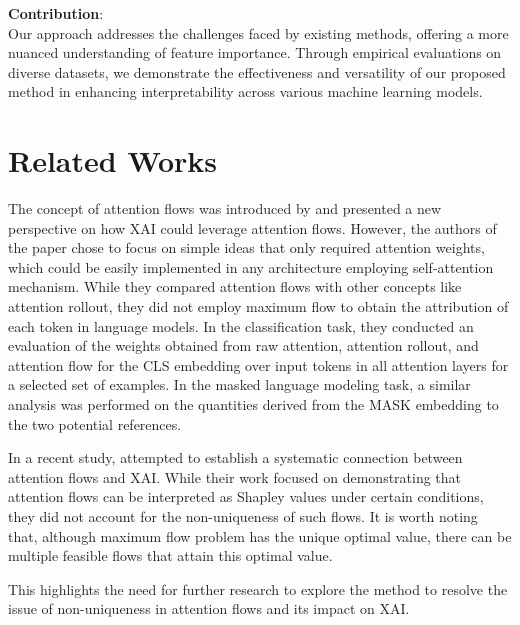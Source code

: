 \documentclass{article} %
\theoremstyle{bfnote}
\newcommand{\adddetail}[2]{\todo[inline, inlinewidth=5cm, author=#2, color=lightpurple]{#1}}
\newcommand{\dcheck}[2]{\todo[inline, inlinewidth=5cm, author=#2, color=neonblue]{#1}}
\begin{document}
\textbf{Contribution}:\\ 
Our approach addresses the challenges faced by existing methods, offering a more nuanced understanding of feature importance. Through empirical evaluations on diverse datasets, we demonstrate the effectiveness and versatility of our proposed method in enhancing interpretability across various machine learning models.

\dcheck{Quaily of Writing}{Max}
\adddetail{Our Contributions?}{Behrooz+Max}



\section{Related Works}
The concept of attention flows was introduced by \cite{abnar2020b} and presented a new perspective on how XAI could leverage attention flows. However, the authors of the paper chose to focus on simple ideas that only required attention weights, which could be easily implemented in any architecture employing self-attention mechanism. While they compared attention flows with other concepts like attention rollout, they did not employ maximum flow to obtain the attribution of each token in language models. In the classification task, they conducted an evaluation of the weights obtained from raw attention, attention rollout, and attention flow for the CLS embedding over input tokens in all attention layers for a selected set of examples. In the masked language modeling task, a similar analysis was performed on the quantities derived from the MASK embedding to the two potential references.

In a recent study, \cite{ethayarajh2021b} attempted to establish a systematic connection between attention flows and XAI. While their work focused on demonstrating that attention flows can be interpreted as Shapley values under certain conditions, they did not account for the non-uniqueness of such flows. It is worth noting that, although maximum flow problem has the unique optimal value, there can be multiple feasible flows that attain this optimal value. 

This highlights the need for further research to explore the method to resolve the issue of non-uniqueness in attention flows and its impact on XAI.
\end{document}
